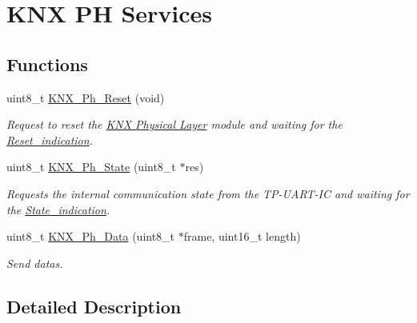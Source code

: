 \hypertarget{group___k_n_x___p_h___sup___exported___functions___group3}{}\section{K\+NX PH Services}
\label{group___k_n_x___p_h___sup___exported___functions___group3}
\subsection*{Functions}
\begin{DoxyCompactItemize}
\item 
uint8\+\_\+t \hyperlink{group___k_n_x___p_h___sup___exported___functions___group3_ga5e5cc508d8f5528f85a275fa9dcb0b25}{K\+N\+X\+\_\+\+Ph\+\_\+\+Reset} (void)
\begin{DoxyCompactList}\small\item\em Request to reset the \hyperlink{group___k_n_x___p_h}{K\+NX Physical Layer} module and waiting for the \hyperlink{group___u_a_r_t___control___from_gade9c58399a01abdaa03bbecbf63879c3}{Reset\+\_\+indication}. \end{DoxyCompactList}\item 
uint8\+\_\+t \hyperlink{group___k_n_x___p_h___sup___exported___functions___group3_ga1032115e95decbb83116f74eeed1f3d0}{K\+N\+X\+\_\+\+Ph\+\_\+\+State} (uint8\+\_\+t $\ast$res)
\begin{DoxyCompactList}\small\item\em Requests the internal communication state from the T\+P-\/\+U\+A\+R\+T-\/\+IC and waiting for the \hyperlink{group___u_a_r_t___control___from_ga736e177182335771d7948dd74a7a1a5f}{State\+\_\+indication}. \end{DoxyCompactList}\item 
uint8\+\_\+t \hyperlink{group___k_n_x___p_h___sup___exported___functions___group3_gacda7a6cf1a296488212387344561568a}{K\+N\+X\+\_\+\+Ph\+\_\+\+Data} (uint8\+\_\+t $\ast$frame, uint16\+\_\+t length)
\begin{DoxyCompactList}\small\item\em Send datas. \end{DoxyCompactList}\end{DoxyCompactItemize}


\subsection{Detailed Description}


